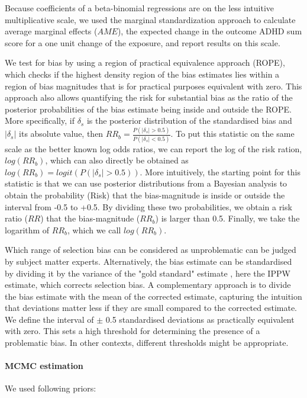 \documentclass[12pt]{article}
\begin{document}
Because coefficients of a beta-binomial regressions are on the less intuitive multiplicative scale, we used the marginal standardization approach \cite{Muller2014-bh} to calculate average marginal effects ($AME$), the expected change in the outcome ADHD sum score for a one unit change of the exposure, and report results on this scale.

We test for bias by using a region of practical equivalence approach (ROPE)\cite{Kruschke2010-zi}, which checks if the highest density region of the bias estimates lies within a region of bias magnitudes that is for practical purposes equivalent with zero. This approach also allows quantifying the risk for substantial bias as the ratio of the posterior probabilities of the bias estimate being inside and outside the ROPE. More specifically, if $\delta_s$ is the posterior distribution of the standardised bias and $|\delta_s|$ its absolute value, then $RR_b =  \frac{P(|\delta_s|>0.5)}{P(|\delta_s|<0.5)}$. To put this statistic on the same scale as the better known log odds ratios, we can report the log of the risk ration, $log(RR_b)$, which can also directly be obtained as  $log(RR_b) = logit(P(|\delta_s|>0.5))$. 
More intuitively, the starting point for this statistic is that we can use posterior distributions from a Bayesian analysis to obtain the probability (Risk) that the bias-magnitude is inside or outside the interval from -0.5 to +0.5. By dividing these two probabilities, we obtain a risk ratio ($RR$) that the bias-magnitude ($RR_b$) is larger than 0.5. Finally, we take the logarithm of $RR_b$, which we call $log(RR_b)$. 

Which range of selection bias can be considered as unproblematic can be judged by subject matter experts. Alternatively, the bias estimate can be standardised by dividing it by the variance of the "gold standard" estimate \cite{Stuart2010-cj}, here the IPPW estimate, which corrects selection bias. A complementary approach is to divide the bias estimate with the mean of the corrected estimate, capturing the intuition that deviations matter less if they are small compared to the corrected estimate. We define the interval of $\pm$ 0.5 standardised deviations as practically equivalent with zero. This sets a high threshold for determining the presence of a problematic bias. In other contexts, different thresholds might be appropriate.

\paragraph{MCMC estimation} 
We used following priors:
\end{document}
